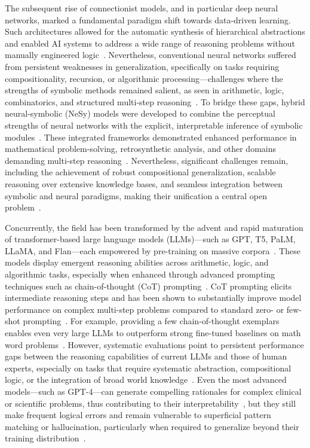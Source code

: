 \documentclass[sigconf]{acmart}
\begin{document}
The subsequent rise of connectionist models, and in particular deep neural networks, marked a fundamental paradigm shift towards data-driven learning. Such architectures allowed for the automatic synthesis of hierarchical abstractions and enabled AI systems to address a wide range of reasoning problems without manually engineered logic~\cite{ref54}. Nevertheless, conventional neural networks suffered from persistent weaknesses in generalization, specifically on tasks requiring compositionality, recursion, or algorithmic processing—challenges where the strengths of symbolic methods remained salient, as seen in arithmetic, logic, combinatorics, and structured multi-step reasoning~\cite{ref42,ref49}. To bridge these gaps, hybrid neural-symbolic (NeSy) models were developed to combine the perceptual strengths of neural networks with the explicit, interpretable inference of symbolic modules~\cite{ref49,ref54}. These integrated frameworks demonstrated enhanced performance in mathematical problem-solving, retrosynthetic analysis, and other domains demanding multi-step reasoning~\cite{ref49}. Nevertheless, significant challenges remain, including the achievement of robust compositional generalization, scalable reasoning over extensive knowledge bases, and seamless integration between symbolic and neural paradigms, making their unification a central open problem~\cite{ref49,ref86}.

Concurrently, the field has been transformed by the advent and rapid maturation of transformer-based large language models (LLMs)—such as GPT, T5, PaLM, LLaMA, and Flan—each empowered by pre-training on massive corpora~\cite{ref1,ref5,ref10,ref11,ref18,ref19,ref42,ref43,ref44,ref70,ref86}. These models display emergent reasoning abilities across arithmetic, logic, and algorithmic tasks, especially when enhanced through advanced prompting techniques such as chain-of-thought (CoT) prompting~\cite{ref10,ref11,ref42}. CoT prompting elicits intermediate reasoning steps and has been shown to substantially improve model performance on complex multi-step problems compared to standard zero- or few-shot prompting~\cite{ref10,ref11,ref42}. For example, providing a few chain-of-thought exemplars enables even very large LLMs to outperform strong fine-tuned baselines on math word problems~\cite{ref11}. However, systematic evaluations point to persistent performance gaps between the reasoning capabilities of current LLMs and those of human experts, especially on tasks that require systematic abstraction, compositional logic, or the integration of broad world knowledge~\cite{ref19,ref43,ref44}. Even the most advanced models—such as GPT-4—can generate compelling rationales for complex clinical or scientific problems, thus contributing to their interpretability~\cite{ref1}, but they still make frequent logical errors and remain vulnerable to superficial pattern matching or hallucination, particularly when required to generalize beyond their training distribution~\cite{ref1,ref18,ref42,ref70}.
\end{document}
